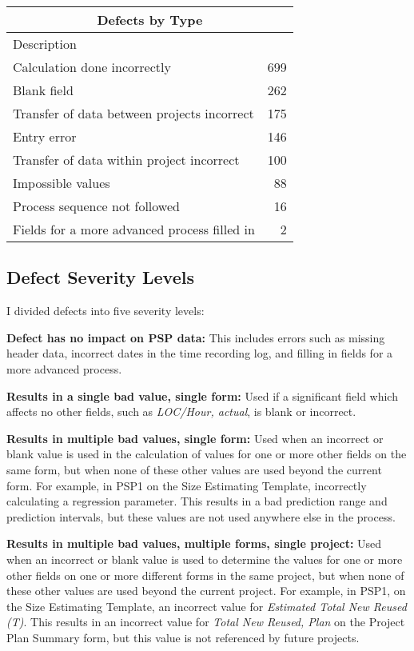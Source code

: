 \begin{tabular}{|l|r|}\hline
\multicolumn{2}{|c|}{\bf Defects by Type}\\ \hline
Description & \\ \hline\hline
Calculation done incorrectly                 & 699 \\ \hline
Blank field                                  & 262 \\ \hline
Transfer of data between projects incorrect  & 175 \\ \hline
Entry error                                  & 146 \\ \hline
Transfer of data within project incorrect    & 100 \\ \hline
Impossible values                            &  88 \\ \hline
Process sequence not followed                &  16 \\ \hline
Fields for a more advanced process filled in &   2 \\ \hline

\end{tabular}


\subsection{Defect Severity Levels}
I divided defects into five severity levels:\newline

{\bf Defect has no impact on PSP data:} This includes errors such as
missing header data, incorrect dates in the time recording log, and 
filling
in fields for a more advanced process.

{\bf Results in a single bad value, single form:} Used if a significant
field which affects no other fields, such as {\it LOC/Hour, actual},
is blank or incorrect.

{\bf Results in multiple bad values, single form:} Used when an 
incorrect
or blank value is used in the calculation of values for one or more 
other
fields on the same form, but when none of these other values are used 
beyond
the current form.  For example, in PSP1 on the Size Estimating Template,
incorrectly calculating a regression parameter.  This results in a bad
prediction range and prediction intervals, but these values are not used
anywhere else in the process.

{\bf Results in multiple bad values, multiple forms, single project:} 
Used
when an incorrect or blank value is used to determine the values
for one or more other fields on one or more different forms in the same
project, but when none of these other values are used beyond the current
project.  For example, in PSP1, on the Size Estimating Template, an
incorrect value for {\it Estimated Total New Reused (T)}.  This results 
in an
incorrect value for {\it Total New Reused, Plan} on the Project Plan 
Summary
form, but this value is not referenced by future projects.

